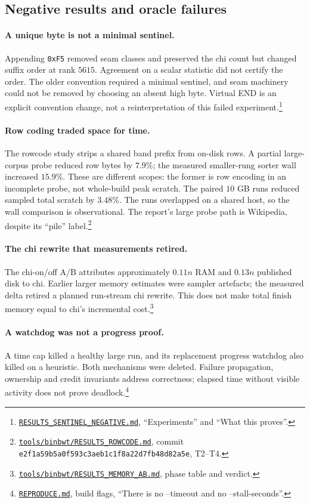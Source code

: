 \documentclass[10pt]{article}
\newcommand{\qnum}[2]{#2}
\newcommand{\ev}[2]{\footnote{\href{https://github.com/pangenome/sxgc/blob/c46a85217b9b269c91179cbebc396f96453181af/#1}{\nolinkurl{#1}}, #2.}}
\newcommand{\old}[3]{\footnote{\href{https://github.com/pangenome/sxgc/blob/#1/#2}{\nolinkurl{#2}}, commit \texttt{#1}, #3.}}
\begin{document}
\subsection{Negative results and oracle failures}
\paragraph{A unique byte is not a minimal sentinel.}
Appending \texttt{\qnum{sentinel}{0xF5}} removed seam classes and preserved the chi count but
changed suffix order at rank $\qnum{rank}{5615}$. Agreement on a scalar statistic did not certify
the order. The older convention required a minimal sentinel, and seam machinery could not be removed
by choosing an absent high byte. Virtual END is an explicit convention change, not a
reinterpretation of this failed experiment.\ev{RESULTS_SENTINEL_NEGATIVE.md}{``Experiments'' and
``What this proves''}

\paragraph{Row coding traded space for time.}
The rowcode study strips a shared band prefix from on-disk rows. A partial large-corpus probe
reduced row bytes by $\qnum{rowcut}{7.9}\%$; the measured smaller-rung sorter wall increased
$\qnum{rowwall}{15.9}\%$. These are different scopes: the former is row encoding in an incomplete
probe, not whole-build peak scratch. The paired $\qnum{ten}{10}$ GB runs reduced sampled total
scratch by $\qnum{scratchcut}{3.48}\%$. The runs overlapped on a shared host, so the wall comparison
is observational. The report's large probe path is Wikipedia, despite its ``pile''
label.\old{e2f1a59b5a0f593c3aeb1c1f8a22d7fb48d82a5e}{tools/binbwt/RESULTS_ROWCODE.md}{T2--T4}

\paragraph{The chi rewrite that measurements retired.}
The chi-on/off A/B attributes approximately $\qnum{chiram}{0.11}n$ RAM and $\qnum{chidisk}{0.13}n$
published disk to chi. Earlier larger memory estimates were sampler artefacts; the measured delta
retired a planned run-stream chi rewrite. This does not make total finish memory equal to chi's
incremental cost.\ev{tools/binbwt/RESULTS_MEMORY_AB.md}{phase table and verdict}

\paragraph{A watchdog was not a progress proof.}
A time cap killed a healthy large run, and its replacement progress watchdog also killed on a
heuristic. Both mechanisms were deleted. Failure propagation, ownership and credit invariants
address correctness; elapsed time without visible activity does not prove
deadlock.\ev{REPRODUCE.md}{build flags, ``There is no --timeout and no --stall-seconds''}
\end{document}
